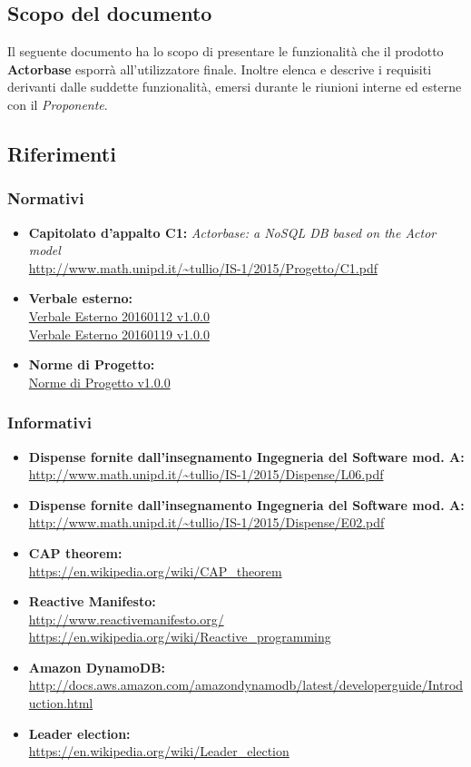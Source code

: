 \documentclass{scalatekids-article}
\begin{document}
\subsection{Scopo del documento}
Il seguente documento ha lo scopo di presentare le funzionalità che il prodotto
\textbf{Actorbase} esporrà all'utilizzatore finale. Inoltre elenca e descrive i
requisiti derivanti dalle suddette funzionalità, emersi durante le riunioni
interne ed esterne con il \textit{Proponente}.
\prodPurpose \glossExpl
\subsection{Riferimenti}
\subsubsection{Normativi}
\begin{itemize}
\item\textbf{Capitolato d'appalto C1:} \textit{Actorbase: a NoSQL DB based on the Actor model}\\
  \url{http://www.math.unipd.it/~tullio/IS-1/2015/Progetto/C1.pdf}
\item\textbf{Verbale esterno:}\\
  \href{run:VerbaleEsterno20160112\_v1.0.0.pdf}{Verbale Esterno 20160112 v1.0.0}\\
  \href{run:VerbaleEsterno20160119\_v1.0.0.pdf}{Verbale Esterno 20160119 v1.0.0}
\item\textbf{Norme di Progetto:}\\
  \href{run:../Interni/NormeDiProgetto\_v1.0.0.pdf}{Norme di Progetto v1.0.0}
\end{itemize}
\subsubsection{Informativi}
\begin{itemize}
\item\textbf{Dispense fornite dall'insegnamento Ingegneria del Software mod. A:}\\
  \url{http://www.math.unipd.it/~tullio/IS-1/2015/Dispense/L06.pdf}
\item\textbf{Dispense fornite dall'insegnamento Ingegneria del Software mod. A:}\\
  \url{http://www.math.unipd.it/~tullio/IS-1/2015/Dispense/E02.pdf}
\item\textbf{CAP theorem:}\\
  \url{https://en.wikipedia.org/wiki/CAP_theorem}
\item\textbf{Reactive Manifesto:}\\
  \url{http://www.reactivemanifesto.org/}\\
  \url{https://en.wikipedia.org/wiki/Reactive_programming}
\item\textbf{Amazon DynamoDB:}\\
  \url{http://docs.aws.amazon.com/amazondynamodb/latest/developerguide/Introduction.html}
\item\textbf{Leader election:}\\
  \url{https://en.wikipedia.org/wiki/Leader_election}
\end{itemize}
\end{document}
